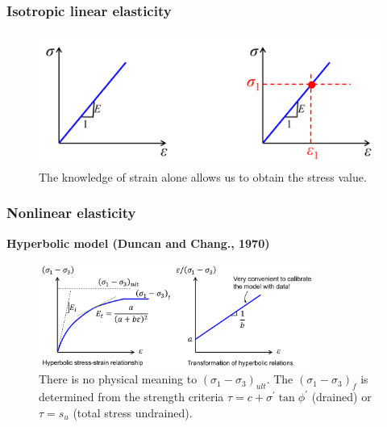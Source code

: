 \documentclass[notes]{beamer}
\begin{document}
\begin{frame}
\frametitle{Isotropic linear elasticity}
\begin{figure}
	\includegraphics[width=\textwidth]{figs/linear-elasticity.png}
	\caption*{The knowledge of strain alone allows us to obtain the stress value.}
\end{figure}
\end{frame}

\begin{frame}
\frametitle{Nonlinear elasticity}
\textbf{Hyperbolic model (Duncan and Chang., 1970)}
\begin{figure}
	\includegraphics[width=0.8\textwidth]{figs/hyperbolic.png}
	\caption*{There is no physical meaning to $(\sigma_1 - \sigma_3)_{ult}$. The $(\sigma_1 - \sigma_3)_f$ is determined from the strength criteria $\tau = c + \sigma^\prime \tan \phi^\prime$ (drained) or $\tau = s_u$ (total stress undrained).}
\end{figure}
\end{frame}
\end{document}
